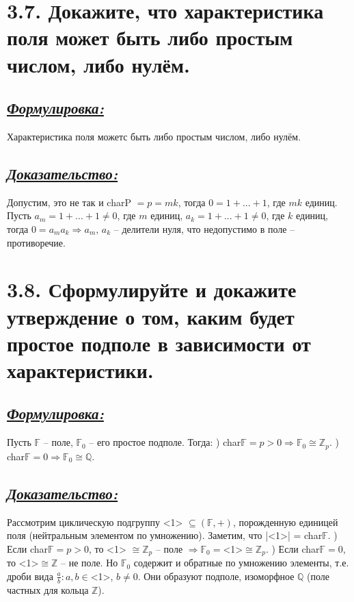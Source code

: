 \documentclass{article}
\begin{document}
\section*{\LARGE 3.7. Докажите, что характеристика поля может быть либо простым числом, либо нулём. }
\subsection*{\Large \underline{\textit{Формулировка: }}}
Характеристика поля можетс быть либо простым числом, либо нулём.

\subsection*{\Large \underline{\textit{Доказательство: }}}
Допустим, это не так и charP $ = p = m k$, тогда $0 = 1 + ... + 1$, где $mk$ единиц. Пусть $a_m = 1 + ... + 1 \ne 0$, где $m$ единиц, $a_k = 1 + ... + 1 \ne 0$, где $k$ единиц, тогда $0 = a_m a_k \Rightarrow a_m,\, a_k$ -- делители нуля, что недопустимо в поле -- противоречие.

\section*{\LARGE 3.8. Сформулируйте и докажите утверждение о том, каким будет простое подполе в зависимости от характеристики. }
\subsection*{\Large \underline{\textit{Формулировка: }}}
Пусть $\mathbb{F}$ -- поле, $\mathbb{F}_0$ -- его простое подполе. Тогда:
\newline{}) char$\mathbb{F} = p > 0 \Rightarrow \mathbb{F}_0 \cong \mathbb{Z}_p$. 
\newline{}) char$\mathbb{F} = 0 \Rightarrow \mathbb{F}_0 \cong \mathbb{Q}$. 

\subsection*{\Large \underline{\textit{Доказательство: }}}
Рассмотрим циклическую подгруппу <1> $\subseteq (\mathbb{F}, +)$, порожденную единицей поля (нейтральным элементом по умножению). Заметим, что |<1>| = char$\mathbb{F}$.
) Если char$\mathbb{F} = p > 0$, то <1> $\cong \mathbb{Z}_p$ -- поле $\Rightarrow \mathbb{F}_0 = $<1>$\cong \mathbb{Z}_p$.
) Если char$\mathbb{F} = 0$, то <1>$\cong \mathbb{Z}$ -- не поле. Но $\mathbb{F}_0$ содержит и обратные по умножению элементы, т.е. дроби вида $\frac{a}{b} : a,b \in$<1>, $b \ne 0$. Они образуют подполе, изоморфное $\mathbb{Q}$ (поле частных для кольца $\mathbb{Z}$).
\end{document}
